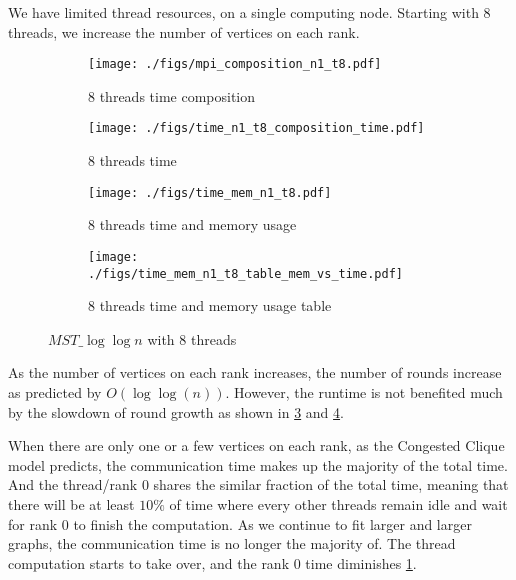 \documentclass[english, 12pt, a4paper, elec, utf8, a-2b, online]{aaltothesis}
\newcommand{\mstalgo}{$MST\_\log\log{n}$}
\begin{document}
We have limited thread resources, on a single computing node. Starting with 8 threads, we increase the number of vertices on each rank.

\begin{figure}[h]
	\centering

	\begin{subfigure}[b]{0.45\textwidth}
			\centering
			\texttt{[image: ./figs/mpi\_composition\_n1\_t8.pdf]}
			\caption{8 threads time composition}
			\label{fig:mpi_composition_n1_t8}
	\end{subfigure}
	\begin{subfigure}[b]{0.45\textwidth}
		\centering
		\texttt{[image: ./figs/time\_n1\_t8\_composition\_time.pdf]}
		\caption{8 threads time}
		\label{fig:mpi_n1_t8_time}
	\end{subfigure}
	\vspace{0mm} %
	\begin{subfigure}[b]{0.45\textwidth}
			\centering
			\texttt{[image: ./figs/time\_mem\_n1\_t8.pdf]}
			\caption{8 threads time and memory usage}
			\label{fig:mpi_composition_n1_t8_time_mem}
	\end{subfigure}
	\hfill
	\begin{subfigure}[b]{0.45\textwidth}
		\centering
		\texttt{[image: ./figs/time\_mem\_n1\_t8\_table\_mem\_vs\_time.pdf]}
		\caption{8 threads time and memory usage table}
		\label{fig:mpi_composition_n1_t8_time_mem_table}
	\end{subfigure}

	\caption{\mstalgo{} with 8 threads}
	\label{fig:mpi_composition_n1_t8_}
\end{figure}

As the number of vertices on each rank increases, the number of rounds increase as predicted by $O(\log{\log(n)})$. However, the runtime is not benefited much by the slowdown of round growth as shown in \cref{fig:mpi_composition_n1_t8_time_mem} and \cref{fig:mpi_composition_n1_t8_time_mem_table}.

When there are only one or a few vertices on each rank, as the Congested Clique model predicts, the communication time makes up the majority of the total time. And the thread/rank 0 shares the similar fraction of the total time, meaning that there will be at least $10\%$ of time where every other threads remain idle and wait for rank 0 to finish the computation. As we continue to fit larger and larger graphs, the communication time is no longer the majority of. The thread computation starts to take over, and the rank 0 time diminishes \cref{fig:mpi_composition_n1_t8}.
\end{document}
